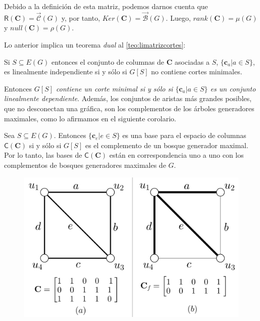  Debido a la definición de esta matriz, podemos darnos cuenta que $\mathsf{R}(\mathbf{C}) =\overrightarrow{\mathcal{C}}(G)$ y, por tanto, $Ker(\mathbf{C}) = \overrightarrow{\mathcal{B}}(G)$. Luego, $rank(\mathbf{C}) = \mu(G)$ y $null(\mathbf{C}) = \rho(G)$.
 
 Lo anterior implica un teorema \textit{dual} al \ref{teo:limatrizcortes}:
 
\begin{teo}\label{teo:limatrizciclos}
Si $S\subseteq E(G)$ entonces el conjunto de columnas de $\mathbf{C}$ asociadas a $S$, $\{\mathbf{c}_{a}| a \in S\}$, es linealmente independiente si y sólo si $G[S]$ no contiene cortes minimales.
\end{teo}

 
 Entonces \textit{$G[S]$ contiene un corte minimal si y sólo si $\{\mathbf{c}_{a} | a \in S\}$ es un conjunto linealmente dependiente}. Además, los conjuntos de aristas más grandes posibles, que no desconectan una gráfica, son los complementos de los árboles generadores maximales, como lo afirmamos en el siguiente corolario.

\begin{cor} Sea
$S \subseteq E(G)$. Entonces $\{\mathbf{c}_{e} | e \in S\}$ es una base para el espacio de columnas $\mathsf{C}(\mathbf{C})$ si y sólo si $G[S]$ es el complemento de un bosque generador maximal. Por lo tanto, las bases de $\mathsf{C}(\mathbf{C})$ están en correspondencia uno a uno con los complementos de bosques generadores maximales de $G$.
\end{cor} 

\begin{figure}[h]
    \centering
    \includegraphics[scale=0.25]{img/imgchapter4/matrizdeciclos.jpg}
    \caption{}
    \label{fig:matrizdeciclos}
\end{figure}

